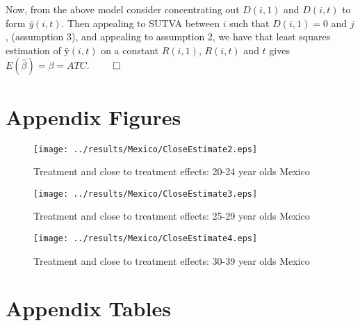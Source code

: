 \documentclass{article}
\begin{document}
\begin{spacing}{1.1}
Now, from the above model consider concentrating out $D(i,1)$ and $D(i,t)$
to form \emph{\"{y}}$(i,t)$.  Then appealing to SUTVA between $i$ such 
that $D(i,1)=0$ and $j$, (assumption 3), and appealing to assumption 2, we 
have that least squares estimation of \"{y}$(i,t)$ on a constant $R(i,1)$,
$R(i,t)$ and $t$ gives $E(\hat\beta)=\beta=ATC$. $\qed$



\section{Appendix Figures}
\label{Sscn:Agraphs}
\begin{figure}[htpb!]
\texttt{[image: ../results/Mexico/CloseEstimate2.eps]}
\caption{Treatment and close to treatment effects: 20-24 year olds Mexico}
\end{figure}
\begin{figure}[htpb!]
\texttt{[image: ../results/Mexico/CloseEstimate3.eps]}
\caption{Treatment and close to treatment effects: 25-29 year olds Mexico}
\end{figure}
\begin{figure}[htpb!]
\texttt{[image: ../results/Mexico/CloseEstimate4.eps]}
\caption{Treatment and close to treatment effects: 30-39 year olds Mexico}
\end{figure}

\section{Appendix Tables}


\end{spacing}
\end{document}

